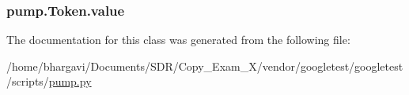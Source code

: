 \subsubsection[{\texorpdfstring{value}{value}}]{\setlength{\rightskip}{0pt plus 5cm}pump.\+Token.\+value}\hypertarget{classpump_1_1_token_a5b7ab395a380b775b2bf0a8b0abfda86}{}\label{classpump_1_1_token_a5b7ab395a380b775b2bf0a8b0abfda86}


The documentation for this class was generated from the following file\+:\begin{DoxyCompactItemize}
\item 
/home/bhargavi/\+Documents/\+S\+D\+R/\+Copy\+\_\+\+Exam\+\_\+X/vendor/googletest/googletest/scripts/\hyperlink{pump_8py}{pump.\+py}\end{DoxyCompactItemize}

